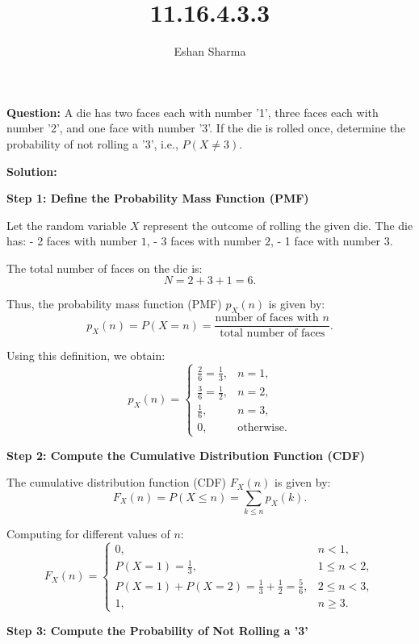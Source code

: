 \documentclass[journal]{IEEEtran}
\begin{document}
	
	
	\vspace{3cm}
	
	\title{11.16.4.3.3}
	\author{Eshan Sharma}
	\maketitle
	\textbf{Question:}
	A die has two faces each with number '1', three faces each with number '2', and one face with number '3'. If the die is rolled once, determine the probability of not rolling a '3', i.e., \( P(X \neq 3) \).
	
	\textbf{Solution:}
	
	\textbf{Step 1: Define the Probability Mass Function (PMF)}
	
	Let the random variable \( X \) represent the outcome of rolling the given die. The die has:
	- 2 faces with number \( 1 \),
	- 3 faces with number \( 2 \),
	- 1 face with number \( 3 \).
	
	The total number of faces on the die is:
	\[
	N = 2 + 3 + 1 = 6.
	\]
	
	Thus, the probability mass function (PMF) \( p_X(n) \) is given by:
	\[
	p_X(n) = P(X = n) = \frac{\text{number of faces with } n}{\text{total number of faces}}.
	\]
	
	Using this definition, we obtain:
	\[
	p_X(n) =
	\begin{cases}
		\frac{2}{6} = \frac{1}{3}, & n = 1, \\
		\frac{3}{6} = \frac{1}{2}, & n = 2, \\
		\frac{1}{6}, & n = 3, \\
		0, & \text{otherwise}.
	\end{cases}
	\]
	
	\textbf{Step 2: Compute the Cumulative Distribution Function (CDF)}
	
	The cumulative distribution function (CDF) \( F_X(n) \) is given by:
	\[
	F_X(n) = P(X \leq n) = \sum_{k \leq n} p_X(k).
	\]
	
	Computing for different values of \( n \):
	\[
	F_X(n) =
	\begin{cases}
		0, & n < 1, \\
		P(X = 1) = \frac{1}{3}, & 1 \leq n < 2, \\
		P(X = 1) + P(X = 2) = \frac{1}{3} + \frac{1}{2} = \frac{5}{6}, & 2 \leq n < 3, \\
		1, & n \geq 3.
	\end{cases}
	\]
	
	\textbf{Step 3: Compute the Probability of Not Rolling a '3'}
	
\end{document}
